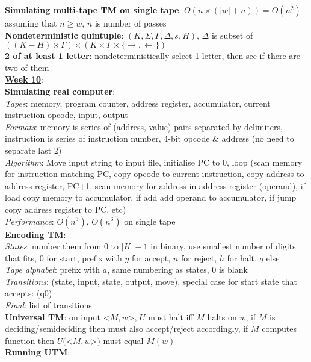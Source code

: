 \documentclass[a4paper]{article}
\begin{document}
\begin{multicols}{2}
        \textbf{Simulating multi-tape TM on single tape}: $O(n \times (|w| + n)) = O(n^2)$ assuming that $n \geq w$, $n$ is number of passes\\
        \textbf{Nondeterministic quintuple}: $(K, \Sigma, \Gamma, \Delta, s, H)$, $\Delta$ is subset of $((K-H)\times\Gamma) \times (K\times\Gamma\times \{ \to, \leftarrow \})$\\
        \textbf{2 of at least 1 letter}: nondeterministically select 1 letter, then see if there are two of them\\
        \underline{\textbf{Week 10}}:\\
        \textbf{Simulating real computer}:\\
        \textit{Tapes}: memory, program counter, address register, accumulator, current instruction opcode, input, output\\
        \textit{Formats}: memory is series of (address, value) pairs separated by delimiters, instruction is series of instruction number, 4-bit opcode \& address (no need to separate last 2)\\
        \textit{Algorithm}: Move input string to input file, initialise PC to 0, loop (scan memory for instruction matching PC, copy opcode to current instruction, copy address to address register, PC+1, scan memory for address in address register (operand), if load copy memory to accumulator, if add add operand to accumulator, if jump copy address register to PC, etc)\\
        \textit{Performance}: $O(n^3)$, $O(n^6)$ on single tape\\
        \textbf{Encoding TM}:\\
        \textit{States}: number them from 0 to $|K| - 1$ in binary, use smallest number of digits that fits, 0 for start, prefix with $y$ for accept, $n$ for reject, $h$ for halt, $q$ else\\
        \textit{Tape alphabet}: prefix with $a$, same numbering as states, 0 is blank\\
        \textit{Transitions}: (state, input, state, output, move), special case for start state that accepts: (q0)\\
        \textit{Final}: list of transitions\\
        \textbf{Universal TM}: on input <$M,w$>, $U$ must halt iff $M$ halts on $w$, if $M$ is deciding/semideciding then must also accept/reject accordingly, if $M$ computes function then $U($<$M,w$>$)$ must equal $M(w)$\\
        \textbf{Running UTM}:\\

\end{multicols}
\end{document}
